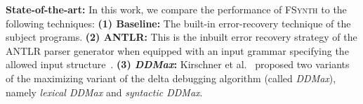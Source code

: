 \documentclass[sigconf,review,anonymous]{acmart}
\newcounter{todocounter}
\newcommand{\todo}[1]{\marginpar{$|$}\textcolor{red}{\stepcounter{todocounter}\footnote[\thetodocounter]{\textcolor{red}{\textbf{TODO }}\textit{#1}}}}
\newcommand{\recheck}[1]{\textcolor{red}{#1}}
\renewcommand{\todo}[1]{}
\newcommand{\ddmin}{\textit{ddmin}\xspace}
\newcommand{\approach}{\textsc{FSynth}\xspace}
\def\ddmin{DDMin\xspace}
\newcommand{\ddmax}{\textit{DDMax}\xspace}
\begin{document}
\noindent\textbf{State-of-the-art:}
In this work, we compare the performance of \approach to the following
techniques:
\noindent\textbf{(1) Baseline:} The built-in error-recovery technique of the subject programs.
\noindent\textbf{(2) ANTLR:} This is the inbuilt error recovery strategy of the ANTLR parser generator when equipped with an input grammar specifying the allowed input structure~\cite[Automatic Error Recovery Strategy]{parr2013definitive}.
\noindent\textbf{(3) \ddmax:} Kirschner et al.~\cite{kirschner2020debugging} proposed %
two variants of the maximizing variant of the delta debugging algorithm (called \ddmax), %
namely \textit{lexical \ddmax} and \textit{syntactic \ddmax}.

%
%
%
%
\end{document}
